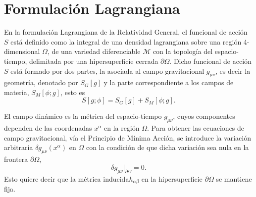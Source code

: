 
\section{Formulaci\'{o}n Lagrangiana}
\label{sec:FL}

En la formulaci\'{o}n Lagrangiana de la Relatividad General, el funcional de acci\'{o}n $S$ est\'{a} definido como la integral de una densidad lagrangiana sobre una regi\'{o}n 4-dimensional $\Omega$, de una variedad diferenciable $\mathcal{M}$ con la topolog\'{i}a del espacio-tiempo, delimitada por una hipersuperficie cerrada $\partial \Omega$.  Dicho funcional de acci\'{o}n $S$ est\'{a} formado por dos partes, la asociada al campo gravitacional $g_{\mu \nu}$, es decir la geometr\'{i}a, denotado por $S_{G}[g]$ y la parte correspondiente a los campos de materia, $S_{M}[\phi; g]$, esto es
%
\begin{equation}
\label{eq:S}
S[g; \phi] = S_{G}[g] + S_{M}[\phi; g].
\end{equation}

El campo din\'{a}mico es la m\'{e}trica del espacio-tiempo $g_{\mu \nu}$, cuyos componentes dependen de las coordenadas $x^{\alpha}$ en la regi\'{o}n $\Omega$. Para obtener las ecuaciones de campo gravitacional, v\'{i}a el Principio de M\'{i}nima Acci\'{o}n, se introduce la variaci\'{o}n arbitraria $\delta g_{\mu \nu}(x^{\alpha})$ en $\Omega$ con la condici\'{o}n de que dicha variaci\'{o}n sea nula en la frontera $\partial \Omega$,
%
\begin{equation}
\label{eq:boundcond}
\delta g_{\mu \nu} \Big|_{\partial \Omega} = 0.
\end{equation}
Esto quiere decir que la m\'{e}trica inducida\footnotemark $h_{\alpha \beta}$ en la hipersuperficie $\partial \Omega$ se mantiene fija.

